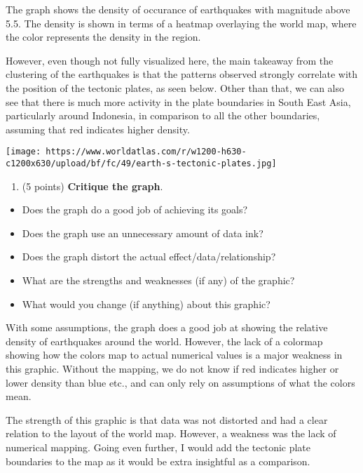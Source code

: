 \documentclass[]{article}
\providecommand{\tightlist}{%
  \setlength{\itemsep}{0pt}\setlength{\parskip}{0pt}}
\begin{document}
The graph shows the density of occurance of earthquakes with magnitude
above 5.5. The density is shown in terms of a heatmap overlaying the
world map, where the color represents the density in the region.

However, even though not fully visualized here, the main takeaway from
the clustering of the earthquakes is that the patterns observed strongly
correlate with the position of the tectonic plates, as seen below. Other
than that, we can also see that there is much more activity in the plate
boundaries in South East Asia, particularly around Indonesia, in
comparison to all the other boundaries, assuming that red indicates
higher density.

\texttt{[image: https://www.worldatlas.com/r/w1200-h630-c1200x630/upload/bf/fc/49/earth-s-tectonic-plates.jpg]}

\begin{enumerate}
\def\labelenumi{\alph{enumi}.}
\setcounter{enumi}{2}
\tightlist
\item
  (5 points) \textbf{Critique the graph}.
\end{enumerate}

\begin{itemize}
\tightlist
\item
  Does the graph do a good job of achieving its goals?
\item
  Does the graph use an unnecessary amount of data ink?
\item
  Does the graph distort the actual effect/data/relationship?
\item
  What are the strengths and weaknesses (if any) of the graphic?
\item
  What would you change (if anything) about this graphic?
\end{itemize}

With some assumptions, the graph does a good job at showing the relative
density of earthquakes around the world. However, the lack of a colormap
showing how the colors map to actual numerical values is a major
weakness in this graphic. Without the mapping, we do not know if red
indicates higher or lower density than blue etc., and can only rely on
assumptions of what the colors mean.

The strength of this graphic is that data was not distorted and had a
clear relation to the layout of the world map. However, a weakness was
the lack of numerical mapping. Going even further, I would add the
tectonic plate boundaries to the map as it would be extra insightful as
a comparison.
\end{document}
